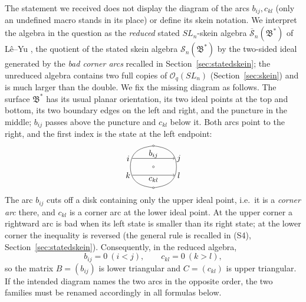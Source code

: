 \documentclass[11pt]{article}
\theoremstyle{remark}
\newcommand{\Skein}{\mathcal S_n}
\newcommand{\redS}{\overline{\mathcal S}_n}
\newcommand{\Bstar}{\mathfrak B^*}
\newcommand{\Oq}{\mathcal O_q(SL_n)}
\begin{document}
The statement we received does not display the diagram of the arcs
$b_{ij},c_{kl}$ (only an undefined macro stands in its place) or
define its skein notation. We interpret the algebra in the question as
the \emph{reduced} stated $SL_n$-skein algebra $\redS(\Bstar)$ of
L\^e--Yu \cite[Section 7.1]{LY}, the quotient of the stated skein
algebra $\Skein(\Bstar)$ by the two-sided ideal generated by the
\emph{bad corner arcs} recalled in Section~\ref{sec:statedskein}; the
unreduced algebra contains two full copies of $\Oq$
(Section~\ref{sec:skein}) and is much larger than the double.
We fix the missing diagram as follows. The surface $\Bstar$ has its
usual planar orientation, its two ideal points at the top and bottom,
its two boundary edges on the left and right, and the puncture in the
middle; $b_{ij}$ passes above the puncture and $c_{kl}$ below it. Both
arcs point to the right, and the first index is the state at the left
endpoint:
\[
\begin{tikzpicture}[baseline=0,scale=0.6]
  \draw (-1.65,0) .. controls (-1.65,1.25) and (-0.7,1.4) .. (0,1.5);
  \draw (0,1.5) .. controls (0.7,1.4) and (1.65,1.25) .. (1.65,0);
  \draw (-1.65,0) .. controls (-1.65,-1.25) and (-0.7,-1.4) .. (0,-1.5);
  \draw (0,-1.5) .. controls (0.7,-1.4) and (1.65,-1.25) .. (1.65,0);
  \filldraw[fill=white] (0,1.5) circle (0.06);
  \filldraw[fill=white] (0,-1.5) circle (0.06);
  \filldraw[fill=white] (0,0) circle (0.065);
  \draw[->] (-1.52,0.6) -- (1.52,0.6);
  \draw[->] (-1.52,-0.6) -- (1.52,-0.6);
  \node at (-1.82,0.6) {$i$};
  \node at (1.82,0.6) {$j$};
  \node at (-1.82,-0.6) {$k$};
  \node at (1.82,-0.6) {$l$};
  \node at (0,0.91) {$b_{ij}$};
  \node at (0,-0.91) {$c_{kl}$};
\end{tikzpicture}
\]
The arc $b_{ij}$ cuts off a disk containing only the upper ideal
point, i.e.\ it is a \emph{corner arc} there, and $c_{kl}$ is a corner
arc at the lower ideal point. At the upper corner a rightward arc
is bad when its left state is smaller than its right state; at the
lower corner the inequality is reversed (the general rule is recalled
in (S4), Section~\ref{sec:statedskein}). Consequently, in the reduced
algebra,
\[
 b_{ij}=0\ (i<j),\qquad c_{kl}=0\ (k>l),
\]
so the matrix $B=(b_{ij})$ is lower triangular and $C=(c_{kl})$ is
upper triangular. If the intended diagram names the two arcs in the
opposite order, the two families must be renamed accordingly in all
formulas below.
\end{document}
